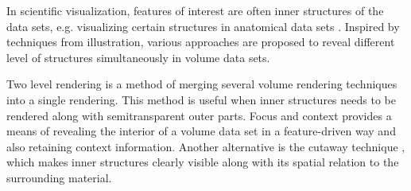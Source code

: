 In scientific visualization, features of interest are often inner structures of the data sets, e.g. visualizing certain structures in anatomical data sets \cite{diaz_iriberri_enhanced_2013}.
Inspired by techniques from illustration, various approaches are proposed to reveal different level of structures simultaneously in volume data sets.

Two level rendering \cite{hauser_two-level_2001} \cite{hadwiger_high-quality_2003} \cite{corcoran_perceptual_2010} is a method of merging several volume rendering techniques into a single rendering. This method is useful when inner structures needs to be rendered along with semitransparent outer parts.
Focus and context \cite{wang_magic_2005} \cite{bruckner_illustrative_2006} \cite{chen_intelligent_2008} provides a means of revealing the interior of a volume data set in a feature-driven way and also retaining context information.
Another alternative is the cutaway technique \cite{burns_feature_2007} \cite{sigg_intelligent_2012}, which makes inner structures clearly visible along with its spatial relation to the surrounding material.

